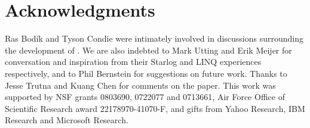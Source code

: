 \section{Acknowledgments}
Ras Bod\'ik and Tyson Condie were intimately involved in discussions surrounding the development of \lang.  We are also indebted to Mark Utting and Erik Meijer for conversation and inspiration from their Starlog and LINQ experiences respectively, and to Phil Bernstein for suggestions on future work.  Thanks to Jesse Trutna and Kuang Chen for comments on the paper. This work was supported by NSF grants 0803690, 0722077 and 0713661, Air Force Office of Scientific Research award 22178970-41070-F, and gifts from Yahoo Research, IBM Research and Microsoft Research.